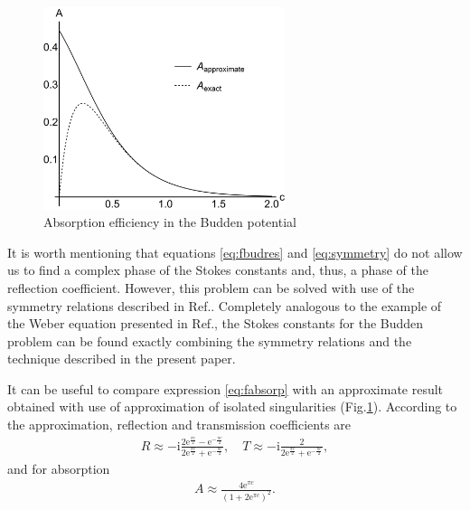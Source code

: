 \documentclass[aip,jmp,reprint]{revtex4-1}
\def\rmi{\mathrm{i}}
\def\rme{\mathrm{e}}
\def\mytextwidth{0.63\textwidth}
\begin{document}
\begin{figure}
\centering
\noindent
\includegraphics[width=\mytextwidth]{absorp.png}
\caption{Absorption efficiency in the Budden potential}
\label{fig:absorp}
\end{figure} 

It is worth mentioning that equations \eqref{eq:fbudres} and \eqref{eq:symmetry} do not allow us
to find a complex phase of the Stokes constants and, thus, a phase of the reflection coefficient.
However, this problem can be solved with use of the symmetry relations described in 
Ref.. Completely analogous to the example of the Weber equation presented in
Ref., the Stokes constants for the Budden problem can be found exactly combining
the symmetry relations and the technique described in the present paper.

It can be useful to compare expression \eqref{eq:fabsorp} with an approximate result 
obtained with use of approximation of isolated singularities (Fig.\ref{fig:absorp}). According to the 
approximation\cite{rwbook}, reflection and transmission coefficients are
\begin{eqnarray}
R \approx 
-\rmi \frac{2 \rme^{\frac{\pi c}{2}} - \rme^{-\frac{\pi c}{2}}}{2 \rme^{\frac{\pi c}{2}} + \rme^{-\frac{\pi c}{2}}},
\quad
T \approx -\rmi \frac{2}{2 \rme^{\frac{\pi c}{2}} + \rme^{-\frac{\pi c}{2}}},
\end{eqnarray}
and for absorption
\begin{eqnarray}
A \approx \frac{4 \rme^{\pi c}}{(1 + 2 \rme^{\pi c})^2}.
\label{eq:aisabsorp}
\end{eqnarray}
\end{document}
